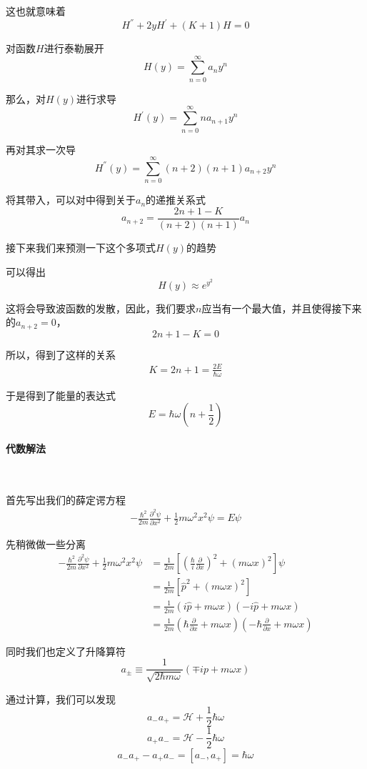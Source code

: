 \documentclass{article}
\begin{document}
这也就意味着
\[H^{''}+2yH^{'}+(K+1)H=0\]

对函数$H$进行泰勒展开
\[
    H(y)=\sum_{n=0}^{\infty}a_ny^n
\]

那么，对$H(y)$进行求导
\[
    H^{'}(y)=\sum_{n=0}^{\infty}na_{n+1}y^{n}
\]

再对其求一次导
\[
    H^{''}(y)=\sum_{n=0}^{\infty}(n+2)(n+1)a_{n+2}y^{n}
\]

将其带入，可以对中得到关于$a_n$的递推关系式
\[a_{n+2}=\frac{2n+1-K}{(n+2)(n+1)}a_n\]

接下来我们来预测一下这个多项式$H(y)$的趋势

可以得出
\[H(y)\approx e^{y^2}\]

这将会导致波函数的发散，因此，我们要求$n$应当有一个最大值，并且使得接下来的$a_{n+2}=0$，
\[2n+1-K=0\]

所以，得到了这样的关系
\begin{align*}
    K=2n+1=\frac{2E}{\hbar\omega}
\end{align*}

于是得到了能量的表达式
\[
    E=\hbar\omega(n+\frac{1}{2})
\]

\paragraph{代数解法}\ 

首先写出我们的薛定谔方程
\begin{align*}
    -\frac{\hbar^2}{2m}\frac{\partial^2\psi}{\partial x^2}+\frac{1}{2}m\omega^2x^2\psi=E\psi
\end{align*}




先稍微做一些分离
\begin{align*}
    -\frac{\hbar^2}{2m}\frac{\partial^2\psi}{\partial x^2}+\frac{1}{2}m\omega^2x^2\psi&=\frac{1}{2m}\left[\left(\frac{\hbar}{i}\frac{\partial}{\partial x}\right)^2+(m\omega x)^2\right]\psi\\
    &=\frac{1}{2m}\left[\hat{p}^2+(m\omega x)^2\right]\\
    &=\frac{1}{2m}(i\hat{p}+m\omega x)(-i\hat{p}+m\omega x)\\
    &=\frac{1}{2m}\left(\hbar\frac{\partial}{\partial x}+m\omega x\right)\left(-\hbar\frac{\partial}{\partial x}+m\omega x\right)
\end{align*}

同时我们也定义了升降算符
\[ a_{\pm }\equiv \frac{1}{\sqrt{2\hbar m\omega}}(\mp ip +m\omega x)\]

通过计算，我们可以发现
\[a_{-}a_{+}=\mathcal{H}+\frac{1}{2}\hbar\omega\]
\[a_{+}a_{-}=\mathcal{H}-\frac{1}{2}\hbar\omega\]
\[a_{-}a_{+}-a_{+}a_{-}=\left[a_{-},a_{+}\right]=\hbar\omega\]
\end{document}
